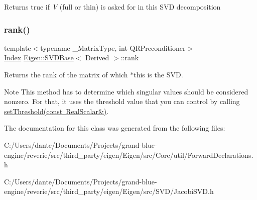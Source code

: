 \begin{DoxyReturn}{Returns}
true if {\itshape V} (full or thin) is asked for in this S\+VD decomposition 
\end{DoxyReturn}
\mbox{\label{class_eigen_1_1_jacobi_s_v_d_a30b89e24f42f1692079eea31b361d26a}} 
\subsubsection{\texorpdfstring{rank()}{rank()}}
{\footnotesize\ttfamily template$<$typename \+\_\+\+Matrix\+Type, int Q\+R\+Preconditioner$>$ \\
\mbox{\hyperlink{class_eigen_1_1_s_v_d_base_a6229a37997eca1072b52cca5ee7a2bec}{Index}} \mbox{\hyperlink{class_eigen_1_1_s_v_d_base}{Eigen\+::\+S\+V\+D\+Base}}$<$ Derived $>$\+::rank\hspace{0.3cm}{\ttfamily [inline]}}

\begin{DoxyReturn}{Returns}
the rank of the matrix of which {\ttfamily $\ast$this} is the S\+VD.
\end{DoxyReturn}
\begin{DoxyNote}{Note}
This method has to determine which singular values should be considered nonzero. For that, it uses the threshold value that you can control by calling \mbox{\hyperlink{class_eigen_1_1_s_v_d_base_a1c95d05398fc15e410a28560ef70a5a6}{set\+Threshold(const Real\+Scalar\&)}}. 
\end{DoxyNote}


The documentation for this class was generated from the following files\+:\begin{DoxyCompactItemize}
\item 
C\+:/\+Users/dante/\+Documents/\+Projects/grand-\/blue-\/engine/reverie/src/third\+\_\+party/eigen/\+Eigen/src/\+Core/util/Forward\+Declarations.\+h\item 
C\+:/\+Users/dante/\+Documents/\+Projects/grand-\/blue-\/engine/reverie/src/third\+\_\+party/eigen/\+Eigen/src/\+S\+V\+D/Jacobi\+S\+V\+D.\+h\end{DoxyCompactItemize}
